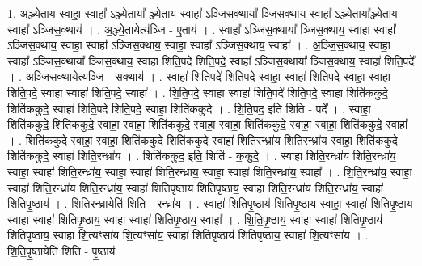 \documentclass[17pt]{extarticle}
\begin{document}
1. अ॒ञ्ज्ये॒ताय॒ स्वाहा॒ स्वाहा᳚ ऽञ्ज्ये॒ताया᳚ ञ्ज्ये॒ताय॒ स्वाहा᳚ ऽञ्जिस॒क्थाया᳚ ञ्जिस॒क्थाय॒ स्वाहा᳚ ऽञ्ज्ये॒ताया᳚ञ्ज्ये॒ताय॒ स्वाहा᳚ ऽञ्जिस॒क्थाय॑ । . अ॒ञ्ज्ये॒तायेत्य॑ञ्जि - ए॒ताय॑ । . स्वाहा᳚ ऽञ्जिस॒क्थाया᳚ ञ्जिस॒क्थाय॒ स्वाहा॒ स्वाहा᳚ ऽञ्जिस॒क्थाय॒ स्वाहा॒ स्वाहा᳚ ऽञ्जिस॒क्थाय॒ स्वाहा॒ स्वाहा᳚ ऽञ्जिस॒क्थाय॒ स्वाहा᳚ । . अ॒ञ्जि॒स॒क्थाय॒ स्वाहा॒ स्वाहा᳚ ऽञ्जिस॒क्थाया᳚ ञ्जिस॒क्थाय॒ स्वाहा॑ शिति॒पदे॑ शिति॒पदे॒ स्वाहा᳚ ऽञ्जिस॒क्थाया᳚ ञ्जिस॒क्थाय॒ स्वाहा॑ शिति॒पदे᳚ । . अ॒ञ्जि॒स॒क्थायेत्य॑ञ्जि - स॒क्थाय॑ । . स्वाहा॑ शिति॒पदे॑ शिति॒पदे॒ स्वाहा॒ स्वाहा॑ शिति॒पदे॒ स्वाहा॒ स्वाहा॑ शिति॒पदे॒ स्वाहा॒ स्वाहा॑ शिति॒पदे॒ स्वाहा᳚ । . शि॒ति॒पदे॒ स्वाहा॒ स्वाहा॑ शिति॒पदे॑ शिति॒पदे॒ स्वाहा॒ शिति॑ककुदे॒ शिति॑ककुदे॒ स्वाहा॑ शिति॒पदे॑ शिति॒पदे॒ स्वाहा॒ शिति॑ककुदे । . शि॒ति॒पद॒ इति॑ शिति - पदे᳚ । . स्वाहा॒ शिति॑ककुदे॒ शिति॑ककुदे॒ स्वाहा॒ स्वाहा॒ शिति॑ककुदे॒ स्वाहा॒ स्वाहा॒ शिति॑ककुदे॒ स्वाहा॒ स्वाहा॒ शिति॑ककुदे॒ स्वाहा᳚ । . शिति॑ककुदे॒ स्वाहा॒ स्वाहा॒ शिति॑ककुदे॒ शिति॑ककुदे॒ स्वाहा॑ शिति॒रन्ध्रा॑य शिति॒रन्ध्रा॑य॒ स्वाहा॒ शिति॑ककुदे॒ शिति॑ककुदे॒ स्वाहा॑ शिति॒रन्ध्रा॑य । . शिति॑ककुद॒ इति॒ शिति॑ - क॒कु॒दे॒ । . स्वाहा॑ शिति॒रन्ध्रा॑य शिति॒रन्ध्रा॑य॒ स्वाहा॒ स्वाहा॑ शिति॒रन्ध्रा॑य॒ स्वाहा॒ स्वाहा॑ शिति॒रन्ध्रा॑य॒ स्वाहा॒ स्वाहा॑ शिति॒रन्ध्रा॑य॒ स्वाहा᳚ । . शि॒ति॒रन्ध्रा॑य॒ स्वाहा॒ स्वाहा॑ शिति॒रन्ध्रा॑य शिति॒रन्ध्रा॑य॒ स्वाहा॑ शितिपृ॒ष्ठाय॑ शितिपृ॒ष्ठाय॒ स्वाहा॑ शिति॒रन्ध्रा॑य शिति॒रन्ध्रा॑य॒ स्वाहा॑ शितिपृ॒ष्ठाय॑ । . शि॒ति॒रन्ध्रा॒येति॑ शिति - रन्ध्रा॑य । . स्वाहा॑ शितिपृ॒ष्ठाय॑ शितिपृ॒ष्ठाय॒ स्वाहा॒ स्वाहा॑ शितिपृ॒ष्ठाय॒ स्वाहा॒ स्वाहा॑ शितिपृ॒ष्ठाय॒ स्वाहा॒ स्वाहा॑ शितिपृ॒ष्ठाय॒ स्वाहा᳚ । . शि॒ति॒पृ॒ष्ठाय॒ स्वाहा॒ स्वाहा॑ शितिपृ॒ष्ठाय॑ शितिपृ॒ष्ठाय॒ स्वाहा॑ शि॒त्यꣳसा॑य शि॒त्यꣳसा॑य॒ स्वाहा॑ शितिपृ॒ष्ठाय॑ शितिपृ॒ष्ठाय॒ स्वाहा॑ शि॒त्यꣳसा॑य । . शि॒ति॒पृ॒ष्ठायेति॑ शिति - पृ॒ष्ठाय॑ । \newline
\end{document}
